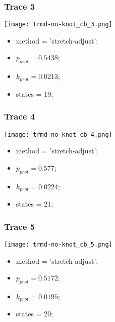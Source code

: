 \begin{minipage}[c]{0.45\textwidth}
\subsubsection{Trace 3}
\begin{minipage}[c]{0.7\textwidth}
    \texttt{[image: trmd-no-knot\_cb\_3.png]}
\end{minipage}
\hfill
\begin{minipage}[c]{0.45\textwidth}
    \begin{itemize}
        \item method = 'stretch-adjust';
        \item $p_{prot}=0.5438$;
        \item $k_{prot}=0.0213$;
        \item states = 19;
    \end{itemize}
\end{minipage}

\subsubsection{Trace 4}
\begin{minipage}[c]{0.7\textwidth}
    \texttt{[image: trmd-no-knot\_cb\_4.png]}
\end{minipage}
\hfill
\begin{minipage}[c]{0.45\textwidth}
    \begin{itemize}
        \item method = 'stretch-adjust';
        \item $p_{prot}=0.577$;
        \item $k_{prot}=0.0224$;
        \item states = 21;
    \end{itemize}
\end{minipage}

\subsubsection{Trace 5}
\begin{minipage}[c]{0.7\textwidth}
    \texttt{[image: trmd-no-knot\_cb\_5.png]}
\end{minipage}
\hfill
\begin{minipage}[c]{0.45\textwidth}
    \begin{itemize}
        \item method = 'stretch-adjust';
        \item $p_{prot}=0.5172$;
        \item $k_{prot}=0.0195$;
        \item states = 20;
    \end{itemize}
\end{minipage}


\end{minipage}
